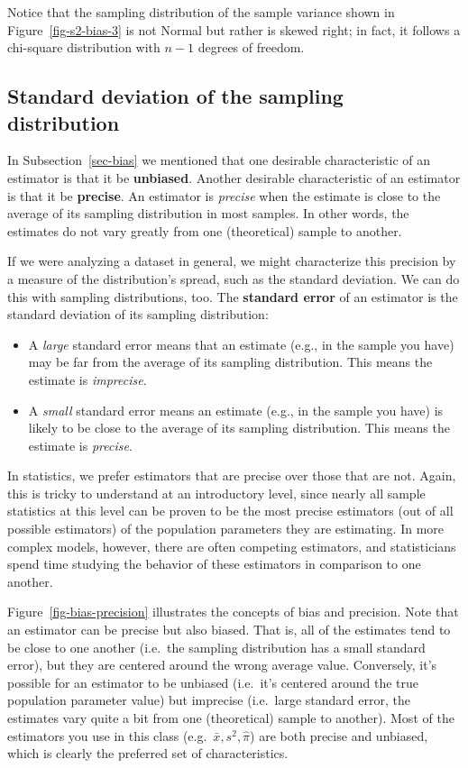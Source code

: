 \documentclass[
  letterpaper,
  DIV=11,
  numbers=noendperiod]{scrreprt}
\providecommand{\tightlist}{%
  \setlength{\itemsep}{0pt}\setlength{\parskip}{0pt}}\usepackage{longtable,booktabs,array}
\theoremstyle{definition}
\theoremstyle{remark}
\begin{document}
Notice that the sampling distribution of the sample variance shown in
Figure~\ref{fig-s2-bias-3} is not Normal but rather is skewed right; in
fact, it follows a chi-square distribution with \(n-1\) degrees of
freedom.

\hypertarget{sec-precision}{%
\subsection{Standard deviation of the sampling
distribution}\label{sec-precision}}

In Subsection~\ref{sec-bias} we mentioned that one desirable
characteristic of an estimator is that it be \textbf{unbiased}. Another
desirable characteristic of an estimator is that it be \textbf{precise}.
An estimator is \emph{precise} when the estimate is close to the average
of its sampling distribution in most samples. In other words, the
estimates do not vary greatly from one (theoretical) sample to another.

If we were analyzing a dataset in general, we might characterize this
precision by a measure of the distribution's spread, such as the
standard deviation. We can do this with sampling distributions, too. The
\textbf{standard error} of an estimator is the standard deviation of its
sampling distribution:

\begin{itemize}
\tightlist
\item
  A \emph{large} standard error means that an estimate (e.g., in the
  sample you have) may be far from the average of its sampling
  distribution. This means the estimate is \emph{imprecise}.
\item
  A \emph{small} standard error means an estimate (e.g., in the sample
  you have) is likely to be close to the average of its sampling
  distribution. This means the estimate is \emph{precise}.
\end{itemize}

In statistics, we prefer estimators that are precise over those that are
not. Again, this is tricky to understand at an introductory level, since
nearly all sample statistics at this level can be proven to be the most
precise estimators (out of all possible estimators) of the population
parameters they are estimating. In more complex models, however, there
are often competing estimators, and statisticians spend time studying
the behavior of these estimators in comparison to one another.

Figure~\ref{fig-bias-precision} illustrates the concepts of bias and
precision. Note that an estimator can be precise but also biased. That
is, all of the estimates tend to be close to one another (i.e.~the
sampling distribution has a small standard error), but they are centered
around the wrong average value. Conversely, it's possible for an
estimator to be unbiased (i.e.~it's centered around the true population
parameter value) but imprecise (i.e.~large standard error, the estimates
vary quite a bit from one (theoretical) sample to another). Most of the
estimators you use in this class (e.g.~\(\bar{x}, s^2, \hat{\pi}\)) are
both precise and unbiased, which is clearly the preferred set of
characteristics.
\end{document}
